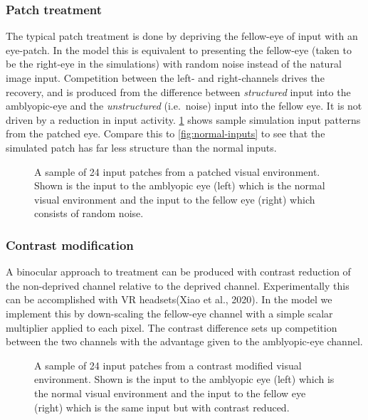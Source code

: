 \documentclass[
  onecolumn]{article}
\begin{document}
\hypertarget{patch-treatment}{%
\subsubsection{Patch treatment}\label{patch-treatment}}

The typical patch treatment is done by depriving the fellow-eye of input
with an eye-patch. In the model this is equivalent to presenting the
fellow-eye (taken to be the right-eye in the simulations) with random
noise instead of the natural image input. Competition between the left-
and right-channels drives the recovery, and is produced from the
difference between \emph{structured} input into the amblyopic-eye and
the \emph{unstructured} (i.e.~noise) input into the fellow eye. It is
not driven by a reduction in input activity. \ref{fig:patch-inputs}
shows sample simulation input patterns from the patched eye. Compare
this to \ref{fig:normal-inputs} to see that the simulated patch has far
less structure than the normal inputs.

\begin{figure}
\hypertarget{fig:patch-inputs}{%
\centering

\caption{A sample of 24 input patches from a patched visual environment.
Shown is the input to the amblyopic eye (left) which is the normal
visual environment and the input to the fellow eye (right) which
consists of random noise.}\label{fig:patch-inputs}
}
\end{figure}

\hypertarget{contrast-modification}{%
\subsubsection{Contrast modification}\label{contrast-modification}}

A binocular approach to treatment can be produced with contrast
reduction of the non-deprived channel relative to the deprived channel.
Experimentally this can be accomplished with VR headsets(Xiao et al.,
2020). In the model we implement this by down-scaling the fellow-eye
channel with a simple scalar multiplier applied to each pixel. The
contrast difference sets up competition between the two channels with
the advantage given to the amblyopic-eye channel.

\begin{figure}
\hypertarget{fig:contrast-modified-inputs}{%
\centering

\caption{A sample of 24 input patches from a contrast modified visual
environment. Shown is the input to the amblyopic eye (left) which is the
normal visual environment and the input to the fellow eye (right) which
is the same input but with contrast
reduced.}\label{fig:contrast-modified-inputs}
}
\end{figure}
\end{document}
